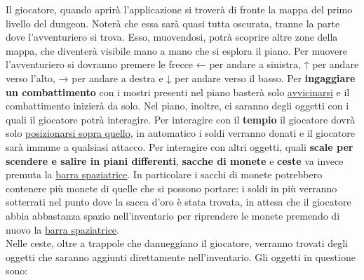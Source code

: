 \documentclass{report}
\begin{document}
Il giocatore, quando aprirà l’applicazione si troverà di fronte la mappa del primo livello del dungeon.
%
Noterà che essa sarà quasi tutta oscurata, tranne la parte dove l’avventuriero si trova. 
%
Esso, muovendosi, potrà scoprire altre zone della mappa, che diventerà visibile mano a mano che si esplora il piano.
%
Per muovere l’avventuriero si dovranno premere le frecce ← per andare a sinistra, ↑ per andare verso l’alto, → per andare a destra e ↓ per andare verso il basso.
%
Per \textbf{ingaggiare un combattimento} con i mostri presenti nel piano basterà solo \underline{avvicinarsi} e il combattimento inizierà da solo.
%
Nel piano, inoltre, ci saranno degli oggetti con i quali il giocatore potrà interagire.
%
Per interagire con il \textbf{tempio} il giocatore dovrà solo \underline{posizionarsi sopra quello}, in automatico i soldi verranno donati e il giocatore sarà immune a qualsiasi attacco.
%
Per interagire con altri oggetti, quali \textbf{scale per scendere e salire in piani differenti}, \textbf{sacche di monete} e \textbf{ceste} va invece premuta la \underline{barra spaziatrice}.
%
In particolare i sacchi di monete potrebbero contenere più monete di quelle che si possono portare: i soldi in più verranno sotterrati nel punto dove la sacca d’oro è stata trovata, in attesa che il giocatore abbia abbastanza spazio nell’inventario per riprendere le monete premendo di nuovo la \underline{barra spaziatrice}. 
%
\\
%
Nelle ceste, oltre a trappole che danneggiano il giocatore, verranno trovati degli oggetti che saranno aggiunti direttamente nell’inventario.
%
Gli oggetti in questione sono:
%
\end{document}
